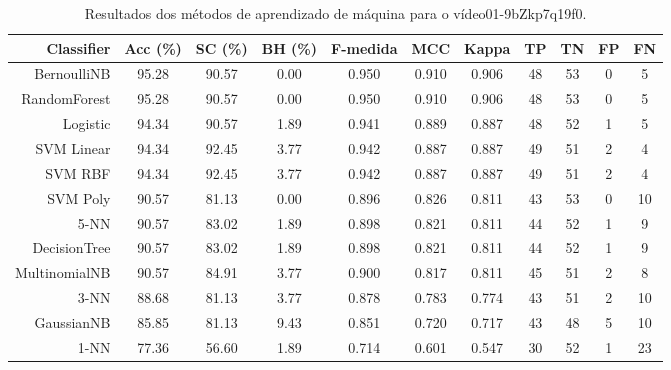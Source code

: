 \begin{table}[!htb]
\centering
\caption{Resultados dos métodos de aprendizado de máquina para o vídeo01-9bZkp7q19f0.}
\label{tab:01-9bZkp7q19f0}
\begin{tabular}{r|c|c|c|c|c|c|c|c|c|c}
\hline\hline
Classifier & Acc (\%) & SC (\%) & BH (\%) & F-medida & MCC & Kappa & TP & TN & FP & FN \\ \hline
BernoulliNB & 95.28 & 90.57 & 0.00 & 0.950 & 0.910 & 0.906 & 48 & 53 & 0 & 5 \\ 
RandomForest & 95.28 & 90.57 & 0.00 & 0.950 & 0.910 & 0.906 & 48 & 53 & 0 & 5 \\ 
Logistic & 94.34 & 90.57 & 1.89 & 0.941 & 0.889 & 0.887 & 48 & 52 & 1 & 5 \\ 
SVM Linear & 94.34 & 92.45 & 3.77 & 0.942 & 0.887 & 0.887 & 49 & 51 & 2 & 4 \\ 
SVM RBF & 94.34 & 92.45 & 3.77 & 0.942 & 0.887 & 0.887 & 49 & 51 & 2 & 4 \\ 
SVM Poly & 90.57 & 81.13 & 0.00 & 0.896 & 0.826 & 0.811 & 43 & 53 & 0 & 10 \\ 
5-NN & 90.57 & 83.02 & 1.89 & 0.898 & 0.821 & 0.811 & 44 & 52 & 1 & 9 \\ 
DecisionTree & 90.57 & 83.02 & 1.89 & 0.898 & 0.821 & 0.811 & 44 & 52 & 1 & 9 \\ 
MultinomialNB & 90.57 & 84.91 & 3.77 & 0.900 & 0.817 & 0.811 & 45 & 51 & 2 & 8 \\ 
3-NN & 88.68 & 81.13 & 3.77 & 0.878 & 0.783 & 0.774 & 43 & 51 & 2 & 10 \\ 
GaussianNB & 85.85 & 81.13 & 9.43 & 0.851 & 0.720 & 0.717 & 43 & 48 & 5 & 10 \\ 
1-NN & 77.36 & 56.60 & 1.89 & 0.714 & 0.601 & 0.547 & 30 & 52 & 1 & 23 \\ 
\hline\hline
\end{tabular}
\end{table}
